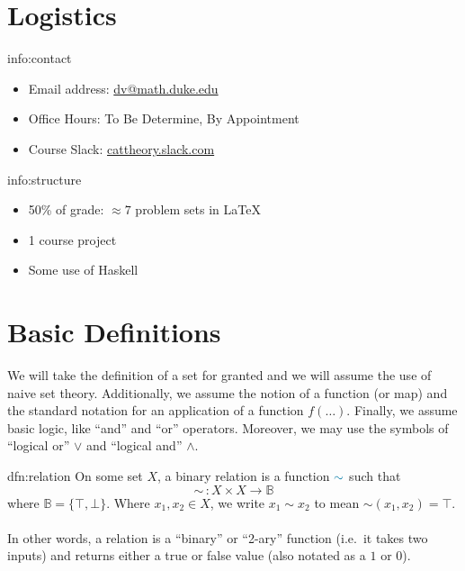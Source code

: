 



\section{Logistics}\label{sec:logistics}

\begin{info}{info:contact}
    \begin{itemize}
        \item Email address: \href{mailto:dv@math.duke.edu}{dv@math.duke.edu}
        \item Office Hours: To Be Determine, By Appointment
        \item Course Slack: \href{cattheory.slack.com}{cattheory.slack.com}
    \end{itemize}
\end{info}

\begin{info}{info:structure}
    \begin{itemize}
        \item 50\% of grade: \( \approx 7 \) problem sets in \LaTeX
        \item 1 course project
        \item Some use of Haskell
    \end{itemize}
\end{info}

\section{Basic Definitions}\label{sec:definitions}

We will take the definition of a set for granted and we will assume the use of naive set theory.
Additionally, we assume the notion of a function (or map) and the standard notation for an application of a function \( f(\ldots) \).
Finally, we assume basic logic, like ``and'' and ``or'' operators.
Moreover, we may use the symbols of ``logical or'' \( \lor \) and ``logical and'' \( \land \).

\begin{dfn}[Relation]{dfn:relation}
    On some set \( X \), a \textcolor{dfn-color}{binary relation} is a function \( \textcolor{dfn-color}{\sim} \) such that
    \[
        \sim \, : X \times X \to \mathbb{B}
    \]
    where \( \mathbb{B} = \{ \top, \bot \} \).
    Where \( x_1, x_2 \in X \), we write \( x_1 \sim x_2 \) to mean \( \sim(x_1, x_2) = \top \).
    \\ \\
    In other words, a relation is a ``binary'' or ``2-ary'' function (i.e.\ it takes two inputs) and returns either a true or false value (also notated as a \( 1 \) or \( 0 \)).
\end{dfn}


